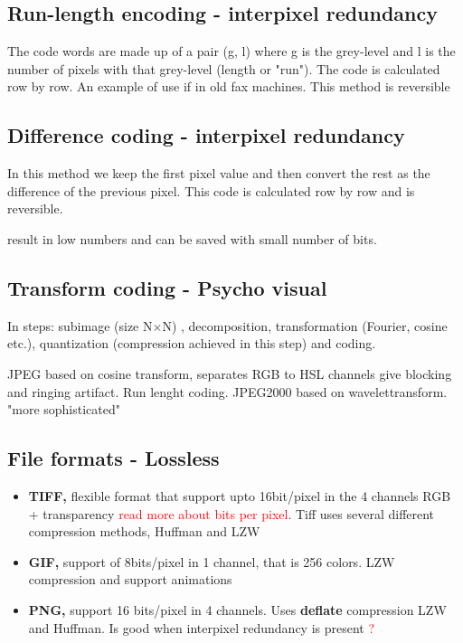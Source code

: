 \subsection*{Run-length encoding - interpixel redundancy}
The code words are made up of a pair (g, l) where g is the grey-level and l is the number of pixels with that grey-level (length or "run"). The code is calculated row by row. An example of use if in old fax machines. This method is reversible 


\subsection*{Difference coding - interpixel redundancy}
In this method we keep the first pixel value and then convert the rest as the difference of the previous pixel. This code is calculated row by row and is reversible.
\begin{wbox}{}
result in low numbers and can be saved with small number of bits. 
\end{wbox}


\subsection*{Transform coding - Psycho visual}
In steps: subimage (size N$\times$N) , decomposition, transformation (Fourier, cosine etc.), quantization (compression achieved in this step) and coding.  

\begin{wbox}{}
JPEG based on cosine transform, separates RGB to HSL channels
give blocking and ringing artifact. Run lenght coding.
JPEG2000 based on wavelettransform. "more sophisticated"
\end{wbox}


\subsection*{File formats - Lossless}
\begin{itemize}
	\item \textbf{TIFF,} flexible format that support upto 16bit/pixel in the 4 channels RGB + transparency \textcolor{red}{read more about bits per pixel}. Tiff uses several different compression methods, Huffman and LZW
	\item \textbf{GIF,} support of 8bits/pixel in 1 channel, that is 256 colors. LZW compression and support animations 
	\item \textbf{PNG,} support 16 bits/pixel in 4 channels. Uses \textbf{deflate} compression LZW and Huffman. Is good when interpixel redundancy is present \textcolor{red}{?}  
\end{itemize}

